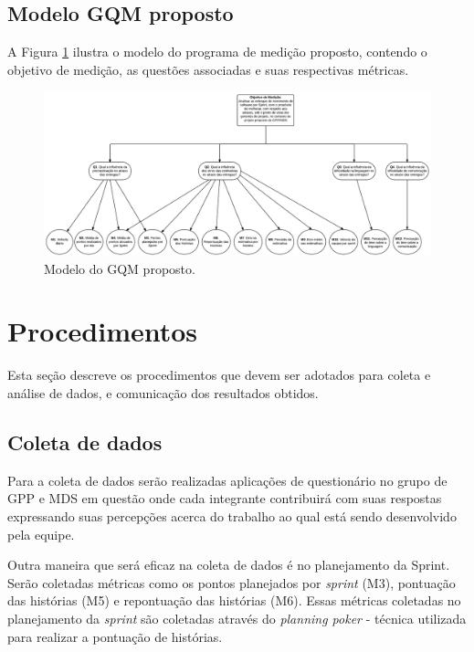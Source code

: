 
      \vfill
      \pagebreak
      \subsection{Modelo GQM proposto}

	A Figura \ref{gqm_proposto} ilustra o modelo do programa de medição proposto, contendo o objetivo de medição, as
	questões associadas e suas respectivas métricas.

	\begin{figure}[!htb]
	  \centering
	  \includegraphics[scale=0.27, angle=90]{figuras/GQM}
	  \caption[Modelo do GQM proposto.]{Modelo do GQM proposto.}
	  \label{gqm_proposto}
	\end{figure}

    \section{Procedimentos}

      Esta seção descreve os procedimentos que devem ser adotados para coleta e análise de dados, e comunicação dos resultados obtidos.

      \subsection{Coleta de dados}

      Para a coleta de dados serão realizadas aplicações de questionário no grupo de GPP e MDS em questão onde cada integrante contribuirá com suas respostas expressando suas percepções acerca do trabalho ao qual está sendo desenvolvido pela equipe.

      Outra maneira que será eficaz na coleta de dados é no planejamento da Sprint. Serão coletadas métricas como os pontos planejados por \textit{sprint} (M3), pontuação das histórias (M5) e repontuação das histórias (M6). Essas métricas coletadas no planejamento da \textit{sprint} são coletadas através do \textit{planning poker} - técnica utilizada para realizar a pontuação de histórias.

